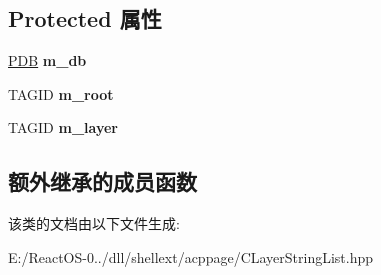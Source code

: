 \subsection*{Protected 属性}
\begin{DoxyCompactItemize}
\item 
\mbox{\label{class_c_layer_string_list_a041198bcd15b1d2787db750ba9b06fed}} 
\hyperlink{struct___d_b}{P\+DB} {\bfseries m\+\_\+db}
\item 
\mbox{\label{class_c_layer_string_list_a076ab267ef19b745b45939607f7cd5ff}} 
T\+A\+G\+ID {\bfseries m\+\_\+root}
\item 
\mbox{\label{class_c_layer_string_list_a084219d9e1544492970a787b93390eea}} 
T\+A\+G\+ID {\bfseries m\+\_\+layer}
\end{DoxyCompactItemize}
\subsection*{额外继承的成员函数}


该类的文档由以下文件生成\+:\begin{DoxyCompactItemize}
\item 
E\+:/\+React\+O\+S-\/0../dll/shellext/acppage/C\+Layer\+String\+List.\+hpp\end{DoxyCompactItemize}
